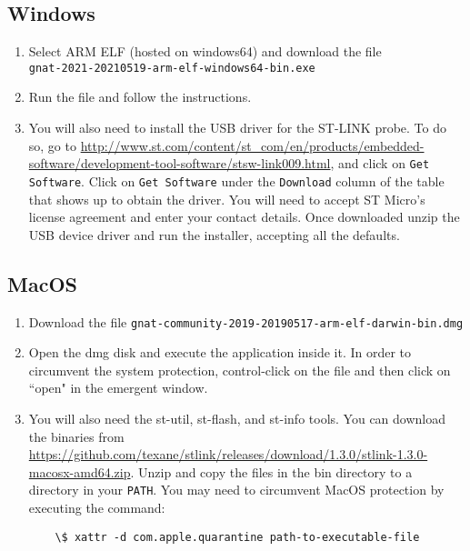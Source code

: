 \subsection{Windows}
\begin{enumerate}
\item Select ARM ELF (hosted on windows64) and download the file\\
{\tt gnat-2021-20210519-arm-elf-windows64-bin.exe}
\item Run the file and follow the instructions.
\item You will also need to install the USB driver for the ST-LINK probe. To do so, go to \url{http://www.st.com/content/st\_com/en/products/embedded-software/development-tool-software/stsw-link009.html}, and click on {\tt Get Software}. Click on {\tt Get Software} under the {\tt Download} column of the table that shows up to obtain the driver. You will need to accept ST Micro's license agreement and enter your contact details. 
Once downloaded unzip the USB device driver and run the installer, accepting all the defaults.
\end{enumerate}
\subsection{MacOS}
\begin{enumerate}
\item Download the file {\tt gnat-community-2019-20190517-arm-elf-darwin-bin.dmg}
\item Open the dmg disk and execute the application inside it. In order to circumvent the system protection, control-click on the file and then click on ``open" in the emergent window.
\item You will also need the st-util,  st-flash, and st-info tools. You can download the binaries from 
\url{https://github.com/texane/stlink/releases/download/1.3.0/stlink-1.3.0-macosx-amd64.zip}. Unzip and copy the files in the bin directory to a directory in your {\tt PATH}. You may need to circumvent MacOS protection by executing the command:
\begin{verbatim}
	\$ xattr -d com.apple.quarantine path-to-executable-file
\end{verbatim}
\end{enumerate}
